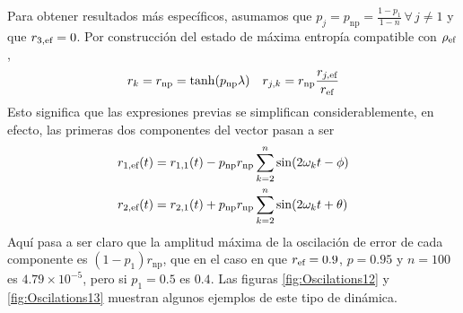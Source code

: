 Para obtener resultados más específicos, asumamos que $p_{j}=p_{\text{np}}=\frac{1-p_{1}}{1-n}\,\forall\,j\neq 1$ y que $r_{3,\text{ef}}=0$. Por construcción del estado de máxima entropía compatible con $\rho_{\text{ef}}$,
\begin{align}
    r_{k}=r_{\text{np}}=\tanh(p_{\text{np}} \lambda) & & r_{j,k}=r_{\text{np}}\frac{r_{j,\text{ef}}}{r_{\text{ef}}}\nonumber
\end{align}
Esto significa que las expresiones previas se simplifican considerablemente, en efecto, las primeras dos componentes del vector pasan a ser
\begin{align}
    r_{1,\text{ef}}(t)&=r_{1,1}(t)-p_{\text{np}}r_{\text{np}}\sum_{k=2}^{n}\sin(2\omega_{k} t-\phi)\nonumber\\
    r_{2,\text{ef}}(t)&=r_{2,1}(t)+p_{\text{np}}r_{\text{np}}\sum_{k=2}^{n}\sin(2\omega_{k} t+\theta)\nonumber
\end{align}
Aquí pasa a ser claro que la amplitud máxima de la oscilación de error de cada componente es $(1-p_{1})r_{\text{np}}$, que en el caso en que $r_{\text{ef}}=0.9$, $p=0.95$ y $n=100$ es $4.79\times 10^{-5}$, pero si $p_{1}=0.5$ es $0.4$. Las figuras \ref{fig:Oscilations12} y \ref{fig:Oscilations13} muestran algunos ejemplos de este tipo de dinámica.


